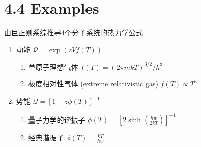 \documentclass{ctexbeamer}
\begin{document}
\section{4.4 Examples}
\begin{frame}{由巨正则系综推导4个分子系统的热力学公式}
    \begin{enumerate}
        \item 动能 $\mathcal{Q} = \exp(zVf(T))$
        \begin{enumerate}
            \item 单原子理想气体 $f(T) = (2\pi m kT)^{3/2}/h^3$
            \item 极度相对性气体 (extreme relativistic gas)
            $f(T) \propto T^3 $
        \end{enumerate}
        \item 势能 $\mathcal{Q} = [1-z\phi(T)]^{-1}$
        \begin{enumerate}
            \item 量子力学的谐振子 $\phi(T)=[2\sinh(\frac{\hbar w}{2kT})]^{-1}$
            \item 经典谐振子 $ \phi(T) = \frac{kT}{\hbar w}$
        \end{enumerate}
    \end{enumerate}
\end{frame}
\end{document}

